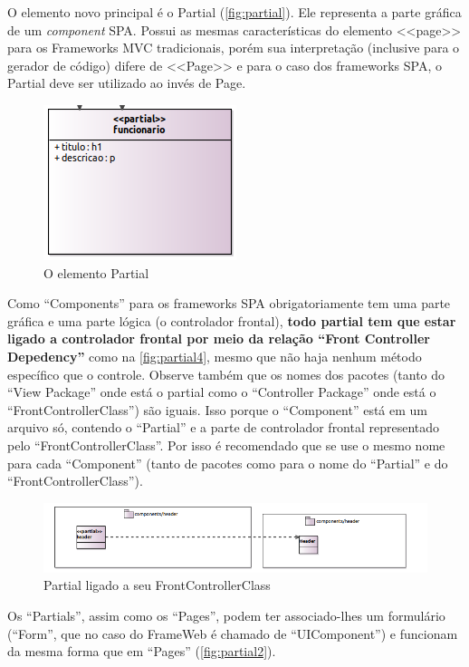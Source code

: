 \documentclass[
article,			%
11pt,				%
oneside,			%
a4paper,			%
english,			%
brazil,				%
sumario=tradicional
]{abntex2}
\begin{document}
O elemento novo principal é o Partial (\autoref{fig:partial}). Ele representa a parte gráfica de um \textit{component} SPA. Possui as mesmas características do elemento <<page>> para os Frameworks MVC tradicionais, porém sua interpretação (inclusive para o gerador de código) difere de <<Page>> e para o caso dos frameworks SPA, o Partial deve ser utilizado ao invés de Page.

\begin{figure}
	\centering
	\includegraphics[width=0.4\linewidth]{figuras/Partial}
	\caption{O elemento Partial}
	\label{fig:partial}
\end{figure}


Como ``Components'' para os frameworks SPA obrigatoriamente tem uma parte gráfica e uma parte lógica (o controlador frontal), \textbf{todo partial tem que estar ligado a controlador frontal por meio da relação ``Front Controller Depedency''} como na \autoref{fig:partial4}, mesmo que não haja nenhum método específico que o controle. Observe também que os nomes dos pacotes (tanto do ``View Package'' onde está o partial como o ``Controller Package'' onde está o ``FrontControllerClass'') são iguais. Isso porque o ``Component'' está em um arquivo só, contendo o ``Partial'' e a parte de controlador frontal representado pelo ``FrontControllerClass''. Por isso é recomendado que se use o mesmo nome para cada ``Component'' (tanto de pacotes como para o nome do ``Partial'' e do ``FrontControllerClass'').

\begin{figure}
	\centering
	\includegraphics[width=0.7\linewidth]{figuras/Partial4}
	\caption{Partial ligado a seu FrontControllerClass}
	\label{fig:partial4}
\end{figure}

Os ``Partials'', assim como os ``Pages'', podem ter associado-lhes um formulário (``Form'', que no caso do FrameWeb é chamado de ``UIComponent'') e funcionam da mesma forma que em ``Pages'' (\autoref{fig:partial2}).
\end{document}
